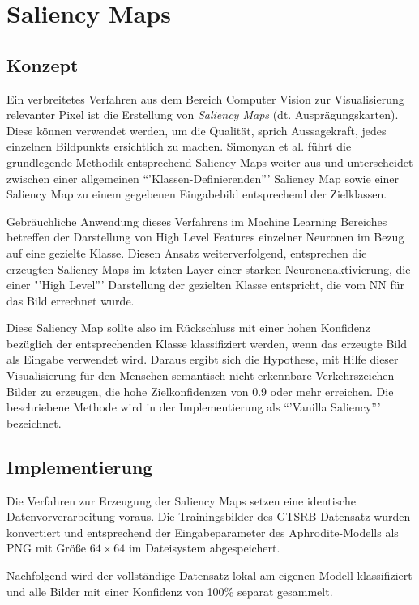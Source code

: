 \chapter{Saliency Maps}
\label{cha:saliency}

\section{Konzept}
Ein verbreitetes Verfahren aus dem Bereich Computer Vision zur Visualisierung relevanter Pixel ist die Erstellung von \textit{Saliency Maps} (dt. Ausprägungskarten). Diese können verwendet werden, um die Qualität, sprich Aussagekraft, jedes einzelnen Bildpunkts ersichtlich zu machen. Simonyan et al. \cite{simonyan_deep_2013} führt die grundlegende Methodik entsprechend Saliency Maps weiter aus und unterscheidet zwischen einer allgemeinen “'Klassen-Definierenden”' Saliency Map sowie einer Saliency Map zu einem gegebenen Eingabebild entsprechend der Zielklassen.


Gebräuchliche Anwendung dieses Verfahrens im Machine Learning Bereiches betreffen der Darstellung von High Level Features einzelner Neuronen \cite{liu_delving_2016} im Bezug auf eine gezielte Klasse. Diesen Ansatz weiterverfolgend, entsprechen die erzeugten Saliency Maps im letzten Layer einer starken Neuronenaktivierung, die einer "'High Level”' Darstellung der gezielten Klasse entspricht, die vom \ac{NN} für das Bild errechnet wurde. 


Diese Saliency Map sollte also im Rückschluss mit einer hohen Konfidenz bezüglich der entsprechenden Klasse klassifiziert werden, wenn das erzeugte Bild als Eingabe verwendet wird. Daraus ergibt sich die Hypothese, mit Hilfe dieser Visualisierung für den Menschen semantisch nicht erkennbare Verkehrszeichen Bilder zu erzeugen, die hohe Zielkonfidenzen von 0.9 oder mehr erreichen. Die beschriebene Methode wird in der Implementierung als “'Vanilla Saliency”' bezeichnet.


\section{Implementierung}

Die Verfahren zur Erzeugung der Saliency Maps setzen eine identische Datenvorverarbeitung voraus. 
Die Trainingsbilder des \ac{GTSRB} Datensatz wurden konvertiert und entsprechend der Eingabeparameter des Aphrodite-Modells als PNG mit Größe $64 \times 64 $ im Dateisystem abgespeichert.

Nachfolgend wird der vollständige Datensatz lokal am eigenen Modell klassifiziert und alle Bilder mit einer Konfidenz von 100\% separat gesammelt. 

